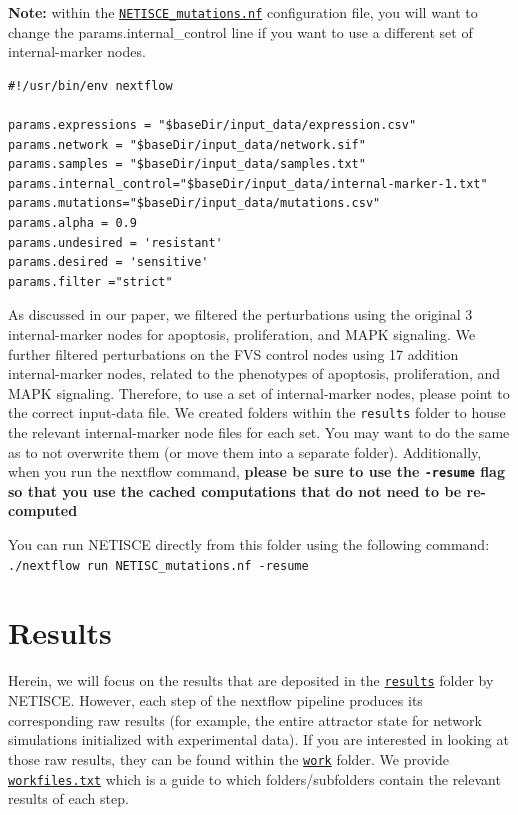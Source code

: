 \documentclass[
]{book}
\begin{document}
\textbf{Note: } within the \href{https://github.com/VeraLiconaResearchGroup/Netisce/blob/main/colorectal_cancer_validation/NETISCE_mutations.nf}{\texttt{NETISCE\_mutations.nf}} configuration file, you will want to change the params.internal\_control line if you want to use a different set of internal-marker nodes.

\begin{verbatim}
#!/usr/bin/env nextflow

params.expressions = "$baseDir/input_data/expression.csv"
params.network = "$baseDir/input_data/network.sif"
params.samples = "$baseDir/input_data/samples.txt"
params.internal_control="$baseDir/input_data/internal-marker-1.txt"
params.mutations="$baseDir/input_data/mutations.csv"
params.alpha = 0.9
params.undesired = 'resistant'
params.desired = 'sensitive'
params.filter ="strict"
\end{verbatim}

As discussed in our paper, we filtered the perturbations using the original 3 internal-marker nodes for apoptosis, proliferation, and MAPK signaling. We further filtered perturbations on the FVS control nodes using 17 addition internal-marker nodes, related to the phenotypes of apoptosis, proliferation, and MAPK signaling. Therefore, to use a set of internal-marker nodes, please point to the correct input-data file. We created folders within the \texttt{results} folder to house the relevant internal-marker node files for each set. You may want to do the same as to not overwrite them (or move them into a separate folder). Additionally, when you run the nextflow command, \textbf{please be sure to use the \texttt{-resume} flag so that you use the cached computations that do not need to be re-computed}

You can run NETISCE directly from this folder using the following command: \texttt{./nextflow\ run\ NETISC\_mutations.nf\ -resume}

\hypertarget{results-2}{%
\section{Results}\label{results-2}}

Herein, we will focus on the results that are deposited in the \href{https://github.com/VeraLiconaResearchGroup/Netisce/tree/main/colorectal_cancer_validation/results}{\texttt{results}} folder by NETISCE. However, each step of the nextflow pipeline produces its corresponding raw results (for example, the entire attractor state for network simulations initialized with experimental data). If you are interested in looking at those raw results, they can be found within the \href{https://github.com/VeraLiconaResearchGroup/Netisce/tree/main/colorectal_cancer_validation/work}{\texttt{work}} folder. We provide \href{https://github.com/VeraLiconaResearchGroup/Netisce/blob/main/colorectal_cancer_validation/work/workfiles.txt}{\texttt{workfiles.txt}} which is a guide to which folders/subfolders contain the relevant results of each step.
\end{document}
